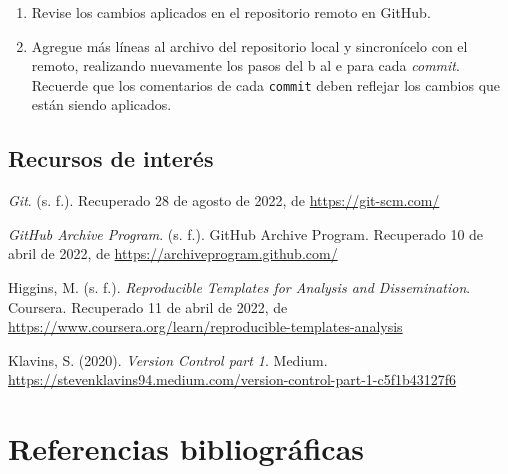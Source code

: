 \documentclass[
  letterpaper,
  DIV=11,
  numbers=noendperiod]{scrreprt}
\providecommand{\tightlist}{%
  \setlength{\itemsep}{0pt}\setlength{\parskip}{0pt}}\usepackage{longtable,booktabs,array}
\begin{document}
\begin{enumerate}
\def\labelenumi{\arabic{enumi}.}
\setcounter{enumi}{4}
\tightlist
\item
  Revise los cambios aplicados en el repositorio remoto en GitHub.
\item
  Agregue más líneas al archivo del repositorio local y sincronícelo con
  el remoto, realizando nuevamente los pasos del b al e para cada
  \emph{commit}. Recuerde que los comentarios de cada \texttt{commit}
  deben reflejar los cambios que están siendo aplicados.
\end{enumerate}

\hypertarget{recursos-de-interuxe9s-1}{%
\section{Recursos de interés}\label{recursos-de-interuxe9s-1}}

\emph{Git}. (s. f.). Recuperado 28 de agosto de 2022, de
\url{https://git-scm.com/}

\emph{GitHub Archive Program}. (s. f.). GitHub Archive Program.
Recuperado 10 de abril de 2022, de
\url{https://archiveprogram.github.com/}

Higgins, M. (s. f.). \emph{Reproducible Templates for Analysis and
Dissemination}. Coursera. Recuperado 11 de abril de 2022, de
\url{https://www.coursera.org/learn/reproducible-templates-analysis}

Klavins, S. (2020). \emph{Version Control part 1}. Medium.
\url{https://stevenklavins94.medium.com/version-control-part-1-c5f1b43127f6}


\hypertarget{referencias-bibliogruxe1ficas}{%
\chapter*{Referencias
bibliográficas}\label{referencias-bibliogruxe1ficas}}
\end{document}
